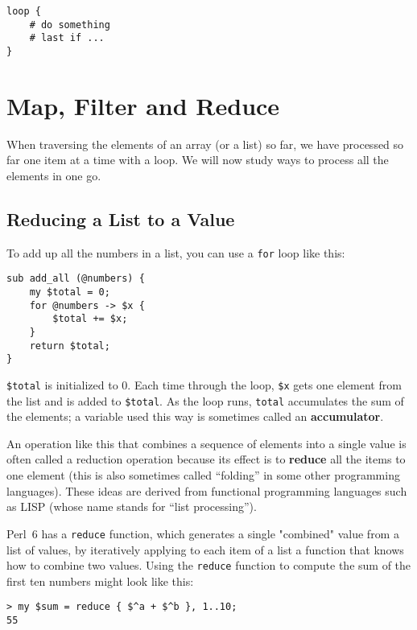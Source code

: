 \begin{verbatim}
loop {
    # do something 
    # last if ...
}
\end{verbatim}
%


\section{Map, Filter and Reduce}
\label{map_filter}

When traversing the elements of an array (or a list) so far, we have 
processed so far one item at a time with a loop. We will 
now study ways to process all the elements in one go.

\subsection{Reducing a List to a Value}

To add up all the numbers in a list, you can use a {\tt for} 
loop like this:


\begin{verbatim}
sub add_all (@numbers) {
    my $total = 0;
    for @numbers -> $x {
        $total += $x;
    }
    return $total;
}
\end{verbatim}
%
{\tt \$total} is initialized to 0.  Each time through the loop,
{\tt \$x} gets one element from the list and is added to 
{\tt \$total}. As the loop runs, {\tt total} accumulates the 
sum of the elements; a variable used this way is sometimes 
called an {\bf accumulator}.

An operation like this that combines a sequence of elements into
a single value is often called a reduction operation because 
its effect is to {\bf reduce} all the items to one element (this 
is also sometimes called ``folding'' in some other programming 
languages). These ideas are derived from functional 
programming languages such as LISP (whose name stands for ``list 
processing'').

Perl~6 has a {\tt reduce} function, which generates a single 
"combined" value from a list of values, by iteratively applying 
to each item of a list a function that knows how to combine two values. 
Using the {\tt reduce} function to compute the sum of the 
first ten numbers might look like this:

\begin{verbatim}
> my $sum = reduce { $^a + $^b }, 1..10;
55
\end{verbatim}


